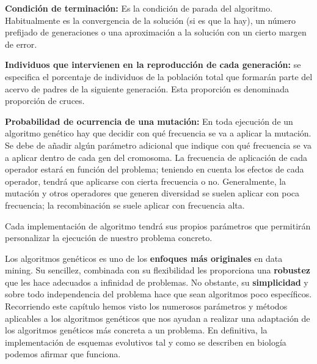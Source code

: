 \documentclass[
  a4paper,
  DIV=11,
  numbers=noendperiod]{scrreprt}
\begin{document}
\textbf{Condición de terminación:} Es la condición de parada del
algoritmo. Habitualmente es la convergencia de la solución (si es que la
hay), un número prefijado de generaciones o una aproximación a la
solución con un cierto margen de error.

\textbf{Individuos que intervienen en la reproducción de cada
generación:} se especifica el porcentaje de individuos de la población
total que formarán parte del acervo de padres de la siguiente
generación. Esta proporción es denominada proporción de cruces.

\textbf{Probabilidad de ocurrencia de una mutación:} En toda ejecución
de un algoritmo genético hay que decidir con qué frecuencia se va a
aplicar la mutación. Se debe de añadir algún parámetro adicional que
indique con qué frecuencia se va a aplicar dentro de cada gen del
cromosoma. La frecuencia de aplicación de cada operador estará en
función del problema; teniendo en cuenta los efectos de cada operador,
tendrá que aplicarse con cierta frecuencia o no. Generalmente, la
mutación y otros operadores que generen diversidad se suelen aplicar con
poca frecuencia; la recombinación se suele aplicar con frecuencia alta.

Cada implementación de algoritmo tendrá sus propios parámetros que
permitirán personalizar la ejecución de nuestro problema concreto.

\begin{tcolorbox}[enhanced jigsaw, opacitybacktitle=0.6, colbacktitle=quarto-callout-important-color!10!white, bottomtitle=1mm, left=2mm, toptitle=1mm, leftrule=.75mm, coltitle=black, rightrule=.15mm, bottomrule=.15mm, toprule=.15mm, colframe=quarto-callout-important-color-frame, colback=white, breakable, titlerule=0mm, title=\textcolor{quarto-callout-important-color}{\faExclamation}\hspace{0.5em}{Recordad}, arc=.35mm, opacityback=0]

Los algoritmos genéticos es uno de los \textbf{enfoques más originales}
en data mining. Su sencillez, combinada con su flexibilidad les
proporciona una \textbf{robustez} que les hace adecuados a infinidad de
problemas. No obstante, su \textbf{simplicidad} y sobre todo
independencia del problema hace que sean algoritmos poco específicos.
Recorriendo este capítulo hemos visto los numerosos parámetros y métodos
aplicables a los algoritmos genéticos que nos ayudan a realizar una
adaptación de los algoritmos genéticos más concreta a un problema. En
definitiva, la implementación de esquemas evolutivos tal y como se
describen en biología podemos afirmar que funciona.

\end{tcolorbox}
\end{document}
